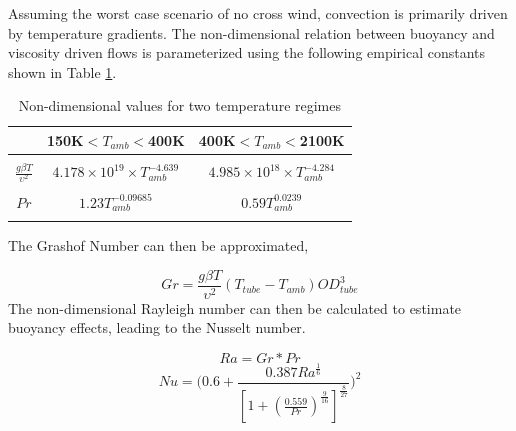 \documentclass[heading.tex]{subfiles}
\begin{document}
Assuming the worst case scenario of no cross wind, convection is primarily driven by temperature gradients.
The non-dimensional relation between buoyancy and viscosity driven flows is parameterized using the 
following empirical constants shown in Table \ref{tab:NonDim}. \cite{Berton} \cite{Incropera}


\begin{table}
    \centering
    \caption{Non-dimensional values for two temperature regimes}
    \label{tab:NonDim}
    \begin{tabular}{ c  |  c |  c} 
        \hline
        & 150K$<T_{amb}<$400K & 400K$< T_{amb}<$2100K \\ \hline 
        &&\\
       $\frac{g \beta T} {\upsilon^2} $ & $4.178\times10^{19} \times T_{amb}^{-4.639}$ & $4.985\times10^{18} \times T_{amb}^{-4.284}$\\
       &&\\ 
        $Pr $ & $1.23 T_{amb}^{-0.09685}$ & $0.59 T_{amb}^{0.0239}$ \\
        &&\\  \hline
    \end{tabular}
\end{table}

The Grashof Number can then be approximated,

\begin{equation}
Gr = \frac{g \beta T} {\upsilon^2}  (T_{tube}-T_{amb}) {OD}_{tube}^3
\end{equation}
The non-dimensional Rayleigh number can then be calculated to estimate buoyancy effects, leading to the Nusselt number.

\begin{equation}
Ra = Gr * Pr
\end{equation}
\begin{equation}
Nu = \Bigg(0.6 + \frac{0.387Ra^{\frac{1}{6}}}{[1+(\frac{0.559}{Pr})^{\frac{9}{16}}]^{\frac{8}{27}}}\Bigg)^2
\end{equation}
\end{document}
